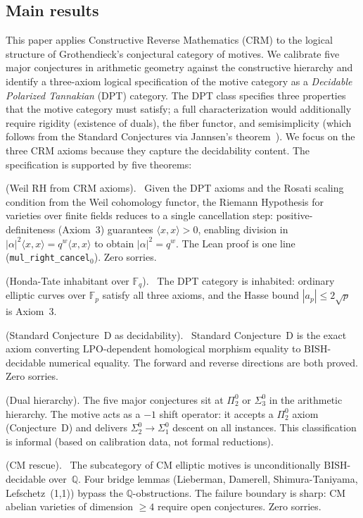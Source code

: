 \documentclass[11pt]{article}
\theoremstyle{definition}
\theoremstyle{remark}
\newcommand{\leanok}{\textsf{\small \textcolor{green!70!black}{\checkmark}}}
\newcommand{\Q}{\mathbb{Q}}
\newcommand{\Fq}{\mathbb{F}_q}
\newcommand{\Fp}{\mathbb{F}_p}
\newcommand{\LPO}{\mathrm{LPO}}
\newcommand{\BISH}{\mathrm{BISH}}
\newcommand{\CRM}{\mathrm{CRM}}
\newcommand{\ip}[2]{\langle #1, #2 \rangle}
\begin{document}
\subsection{Main results}

This paper applies Constructive Reverse Mathematics ($\CRM$) to the logical structure of Grothendieck's conjectural category of motives. We calibrate five major conjectures in arithmetic geometry against the constructive hierarchy and identify a three-axiom logical specification of the motive category as a \emph{Decidable Polarized Tannakian} (DPT) category. The DPT class specifies three properties that the motive category must satisfy; a full characterization would additionally require rigidity (existence of duals), the fiber functor, and semisimplicity (which follows from the Standard Conjectures via Jannsen's theorem~\cite{Jannsen1992}). We focus on the three CRM axioms because they capture the decidability content. The specification is supported by five theorems:

\begin{description}[leftmargin=2em]
\item[Theorem A] (Weil RH from CRM axioms). \leanok\ Given the DPT axioms and the Rosati scaling condition from the Weil cohomology functor, the Riemann Hypothesis for varieties over finite fields reduces to a single cancellation step: positive-definiteness (Axiom~3) guarantees $\ip{x}{x} > 0$, enabling division in $|\alpha|^2 \ip{x}{x} = q^w \ip{x}{x}$ to obtain $|\alpha|^2 = q^w$. The Lean proof is one line (\texttt{mul\_right\_cancel$_0$}). Zero sorries.

\item[Theorem B] (Honda-Tate inhabitant over $\Fq$). \leanok\ The DPT category is inhabited: ordinary elliptic curves over $\Fp$ satisfy all three axioms, and the Hasse bound $|a_p| \leq 2\sqrt{p}$ is Axiom~3.

\item[Theorem C] (Standard Conjecture~D as decidability). \leanok\ Standard Conjecture~D is the exact axiom converting $\LPO$-dependent homological morphism equality to $\BISH$-decidable numerical equality. The forward and reverse directions are both proved. Zero sorries.

\item[Observation D] (Dual hierarchy). The five major conjectures sit at $\Pi_2^0$ or $\Sigma_3^0$ in the arithmetic hierarchy. The motive acts as a $-1$ shift operator: it accepts a $\Pi_2^0$ axiom (Conjecture~D) and delivers $\Sigma_2^0 \to \Sigma_1^0$ descent on all instances. This classification is informal (based on calibration data, not formal reductions).

\item[Theorem E] (CM rescue). \leanok\ The subcategory of CM elliptic motives is unconditionally $\BISH$-decidable over~$\Q$. Four bridge lemmas (Lieberman, Damerell, Shimura-Taniyama, Lefschetz~(1,1)) bypass the $\Q$-obstructions. The failure boundary is sharp: CM abelian varieties of dimension $\geq 4$ require open conjectures. Zero sorries.
\end{description}
\end{document}
